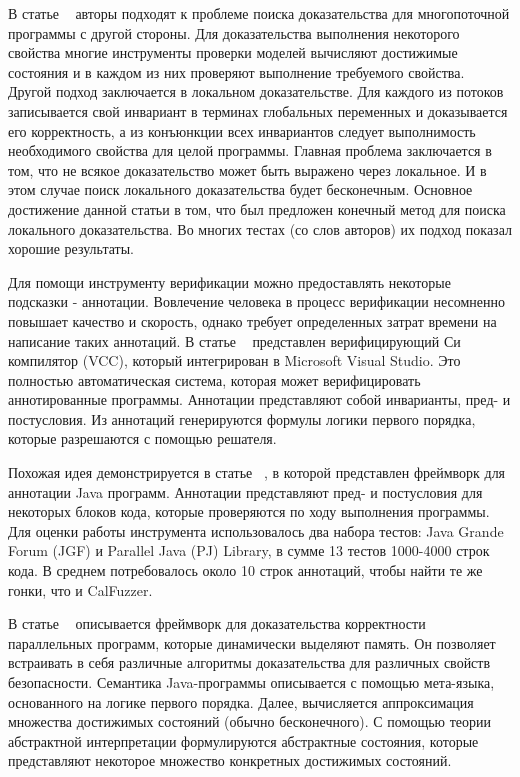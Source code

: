 В статье ~\cite{Cohen:2009} авторы подходят к проблеме поиска доказательства для многопоточной программы с другой стороны. 
Для доказательства выполнения некоторого свойства многие инструменты проверки моделей вычисляют достижимые состояния и в каждом из них проверяют выполнение требуемого свойства.
Другой подход заключается в локальном доказательстве. Для каждого из потоков записывается свой инвариант в терминах глобальных переменных и доказывается его корректность, а из конъюнкции всех инвариантов следует выполнимость необходимого свойства для целой программы. 
Главная проблема заключается в том, что не всякое доказательство может быть выражено через локальное. И в этом случае поиск локального доказательства будет бесконечным.
Основное достижение данной статьи в том, что был предложен конечный метод для поиска локального доказательства. 
Во многих тестах (со слов авторов) их подход показал хорошие результаты. 

Для помощи инструменту верификации можно предоставлять некоторые подсказки - аннотации. Вовлечение человека в процесс верификации несомненно повышает качество и скорость, однако требует определенных затрат времени на написание таких аннотаций. 
В статье ~\cite{VCC:2009} представлен верифицирующий Си компилятор (VCC), который интегрирован в Microsoft Visual Studio. Это полностью автоматическая система, которая может верифицировать аннотированные программы. Аннотации представляют собой инварианты, пред- и постусловия. Из аннотаций генерируются формулы логики первого порядка, которые разрешаются с помощью решателя.

Похожая идея демонстрируется в статье ~\cite{Burnim:2009}, в которой представлен фреймворк для аннотации Java программ. Аннотации представляют пред- и постусловия для некоторых блоков кода, которые проверяются по ходу выполнения программы. 
Для оценки работы инструмента использовалось два набора тестов: Java Grande Forum (JGF) и Parallel Java (PJ) Library, в сумме 13 тестов 1000-4000 строк кода. В среднем потребовалось около 10 строк аннотаций, чтобы найти те же гонки, что и CalFuzzer. 

В статье ~\cite{Yahav:2008} описывается фреймворк для доказательства корректности параллельных программ, которые динамически выделяют память.
Он позволяет встраивать в себя различные алгоритмы доказательства для различных свойств безопасности.
Семантика Java-программы описывается с помощью мета-языка, основанного на логике первого порядка.
Далее, вычисляется аппроксимация множества достижимых состояний (обычно бесконечного).
С помощью теории абстрактной интерпретации формулируются абстрактные состояния, которые представляют некоторое множество конкретных достижимых состояний.

